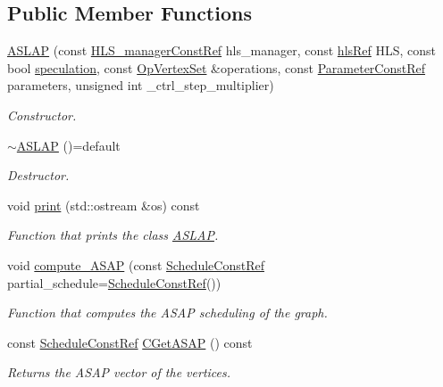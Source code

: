 \subsection*{Public Member Functions}
\begin{DoxyCompactItemize}
\item 
\hyperlink{classASLAP_a08321649fa5caf4d06d4b874cb82bcf6}{A\+S\+L\+AP} (const \hyperlink{hls__manager_8hpp_a1b481383e3beabc89bd7562ae672dd8c}{H\+L\+S\+\_\+manager\+Const\+Ref} hls\+\_\+manager, const \hyperlink{hls_8hpp_a75d0c73923d0ddfa28c4843a802c73a7}{hls\+Ref} H\+LS, const bool \hyperlink{classASLAP_a90fd3ac454f4224f8ac7b57da07b59d3}{speculation}, const \hyperlink{classOpVertexSet}{Op\+Vertex\+Set} \&operations, const \hyperlink{Parameter_8hpp_a37841774a6fcb479b597fdf8955eb4ea}{Parameter\+Const\+Ref} parameters, unsigned int \+\_\+ctrl\+\_\+step\+\_\+multiplier)
\begin{DoxyCompactList}\small\item\em Constructor. \end{DoxyCompactList}\item 
\hyperlink{classASLAP_a5361c6e6c44d526ae2936892203ad734}{$\sim$\+A\+S\+L\+AP} ()=default
\begin{DoxyCompactList}\small\item\em Destructor. \end{DoxyCompactList}\item 
void \hyperlink{classASLAP_a19d19a74b5b0d8d0aec0107b4b1cc656}{print} (std\+::ostream \&os) const
\begin{DoxyCompactList}\small\item\em Function that prints the class \hyperlink{classASLAP}{A\+S\+L\+AP}. \end{DoxyCompactList}\item 
void \hyperlink{classASLAP_ab4b7512adc6da387e14c20023b70b618}{compute\+\_\+\+A\+S\+AP} (const \hyperlink{schedule_8hpp_a85e4dea8a1611026193d8ca13fc5a260}{Schedule\+Const\+Ref} partial\+\_\+schedule=\hyperlink{schedule_8hpp_a85e4dea8a1611026193d8ca13fc5a260}{Schedule\+Const\+Ref}())
\begin{DoxyCompactList}\small\item\em Function that computes the A\+S\+AP scheduling of the graph. \end{DoxyCompactList}\item 
const \hyperlink{schedule_8hpp_a85e4dea8a1611026193d8ca13fc5a260}{Schedule\+Const\+Ref} \hyperlink{classASLAP_ad6058569d9ca53989edd325ded607c04}{C\+Get\+A\+S\+AP} () const
\begin{DoxyCompactList}\small\item\em Returns the A\+S\+AP vector of the vertices. \end{DoxyCompactList}\item 

\end{DoxyCompactItemize}
